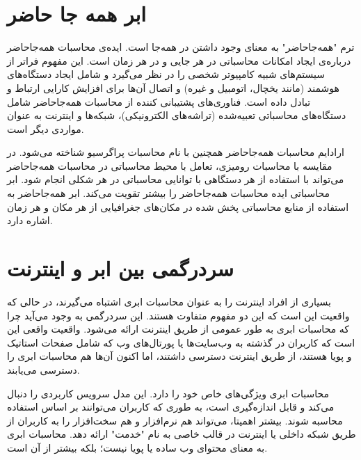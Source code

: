 \documentclass{book}
\begin{document}
            \section{ابر همه جا حاضر}
            ترم "همه‌جاحاضر" به معنای وجود داشتن در همه‌جا است. ایده‌ی محاسبات همه‌جاحاضر درباره‌ی ایجاد امکانات محاسباتی در هر جایی و در هر زمان است. این مفهوم فراتر از سیستم‌های شبیه کامپیوتر شخصی را در نظر می‌گیرد و شامل ایجاد دستگاه‌های هوشمند (مانند یخچال، اتومبیل و غیره) و اتصال آن‌ها برای افزایش کارایی ارتباط و تبادل داده است. فناوری‌های پشتیبانی کننده از محاسبات همه‌جاحاضر شامل دستگاه‌های محاسباتی تعبیه‌شده (تراشه‌های الکترونیکی)، شبکه‌ها و اینترنت به عنوان مواردی دیگر است.

            ارادایم محاسبات همه‌جاحاضر همچنین با نام محاسبات پراگرسیو شناخته می‌شود. در مقایسه با محاسبات رومیزی، تعامل با محیط محاسباتی در محاسبات همه‌جاحاضر می‌تواند با استفاده از هر دستگاهی با توانایی محاسباتی در هر شکلی انجام شود. ابر محاسباتی ایده محاسبات همه‌جاحاضر را بیشتر تقویت می‌کند. ابر همه‌جاحاضر به استفاده از منابع محاسباتی پخش شده در مکان‌های جغرافیایی از هر مکان و هر زمان اشاره دارد.


            \section{سردرگمی بین ابر و اینترنت}
            بسیاری از افراد اینترنت را به عنوان محاسبات ابری اشتباه می‌گیرند، در حالی که واقعیت این است که این دو مفهوم متفاوت هستند. این سردرگمی به وجود می‌آید چرا که محاسبات ابری به طور عمومی از طریق اینترنت ارائه می‌شود. واقعیت واقعی این است که کاربران در گذشته به وب‌سایت‌ها یا پورتال‌های وب که شامل صفحات استاتیک و پویا هستند، از طریق اینترنت دسترسی داشتند، اما اکنون آن‌ها هم محاسبات ابری را دسترسی می‌یابند.

            محاسبات ابری ویژگی‌های خاص خود را دارد. این مدل سرویس کاربردی را دنبال می‌کند و قابل اندازه‌گیری است، به طوری که کاربران می‌توانند بر اساس استفاده محاسبه شوند. بیشتر اهمیتا، می‌تواند هم نرم‌افزار و هم سخت‌افزار را به کاربران از طریق شبکه داخلی یا اینترنت در قالب خاصی به نام "خدمت" ارائه دهد. محاسبات ابری به معنای محتوای وب ساده یا پویا نیست؛ بلکه بیشتر از آن است.

    
\end{document}
